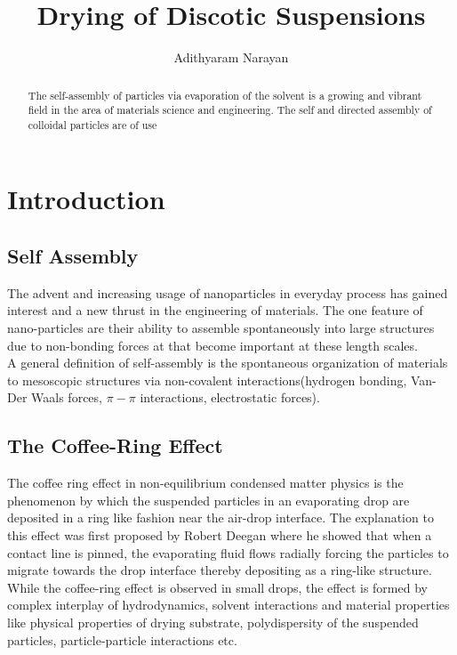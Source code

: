 \documentclass[aps,secnumarabic,nobalancelastpage,amssymb,
nofootinbib,nobibnotes,amsmath,prl,longbibliography,12pt]{revtex4-1}
\begin{document}
\begin{titlepage}

\title{Drying of Discotic Suspensions}
\author{Adithyaram Narayan}




\begin{abstract}
The self-assembly of particles via evaporation of the solvent is a growing and vibrant field in the area of materials science and engineering. The self and directed assembly of colloidal particles are of use 
\end{abstract}

\maketitle


\end{titlepage}

\section{Introduction}

\subsection{Self Assembly}
The advent and increasing usage of nanoparticles in everyday process has gained interest and a new thrust in the engineering of materials. The one feature of nano-particles are their ability to assemble spontaneously into large structures due to non-bonding forces at that become important at these length scales.\\ A general definition of self-assembly is the spontaneous organization of materials to mesoscopic structures via non-covalent interactions(hydrogen bonding, Van-Der Waals forces, $\pi-\pi$ interactions, electrostatic forces)\cite{SelfADMA}. 

\subsection{The Coffee-Ring Effect}
The coffee ring effect in non-equilibrium condensed matter physics is the phenomenon by which the suspended particles in an evaporating drop are deposited in a ring like fashion near the air-drop interface. The explanation to this effect was first proposed by Robert Deegan\cite{deegan}\cite{deegan1997capillary} where he showed that when a contact line is pinned, the evaporating fluid flows radially forcing the particles to migrate towards the drop interface thereby depositing as a ring-like structure. While the coffee-ring effect is observed in small drops, the effect is formed by complex interplay of hydrodynamics, solvent interactions and material properties like physical properties of drying substrate, polydispersity of the suspended particles, particle-particle interactions\cite{C2NR30286A} etc.\\ 
\end{document}
